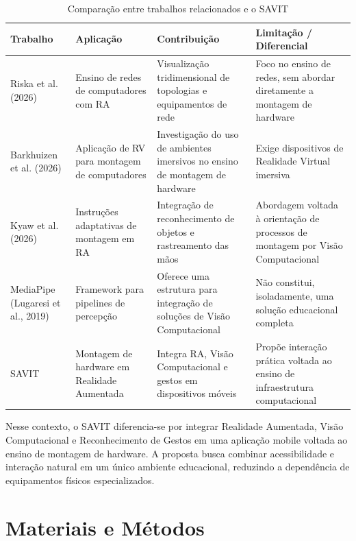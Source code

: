\documentclass[11pt,a4paper]{article}
\begin{document}
\begin{table}[H]
\centering
\caption{Comparação entre trabalhos relacionados e o SAVIT}
\label{tab:estado-arte}
\small
\begin{tabular}{|p{3.1cm}|p{3.4cm}|p{3.4cm}|p{3.4cm}|}
\hline
\textbf{Trabalho} & \textbf{Aplicação} & \textbf{Contribuição} & \textbf{Limitação / Diferencial} \\
\hline

Riska et al. (2026) &
Ensino de redes de computadores com RA &
Visualização tridimensional de topologias e equipamentos de rede &
Foco no ensino de redes, sem abordar diretamente a montagem de hardware \\
\hline

Barkhuizen et al. (2026) &
Aplicação de RV para montagem de computadores &
Investigação do uso de ambientes imersivos no ensino de montagem de hardware &
Exige dispositivos de Realidade Virtual imersiva \\
\hline

Kyaw et al. (2026) &
Instruções adaptativas de montagem em RA &
Integração de reconhecimento de objetos e rastreamento das mãos &
Abordagem voltada à orientação de processos de montagem por Visão Computacional \\
\hline

MediaPipe (Lugaresi et al., 2019) &
Framework para pipelines de percepção &
Oferece uma estrutura para integração de soluções de Visão Computacional &
Não constitui, isoladamente, uma solução educacional completa \\
\hline

SAVIT &
Montagem de hardware em Realidade Aumentada &
Integra RA, Visão Computacional e gestos em dispositivos móveis &
Propõe interação prática voltada ao ensino de infraestrutura computacional \\
\hline

\end{tabular}
\end{table}

Nesse contexto, o SAVIT diferencia-se por integrar Realidade Aumentada, Visão Computacional e Reconhecimento de Gestos em uma aplicação mobile voltada ao ensino de montagem de hardware. A proposta busca combinar acessibilidade e interação natural em um único ambiente educacional, reduzindo a dependência de equipamentos físicos especializados.

\section{Materiais e Métodos}
\end{document}
